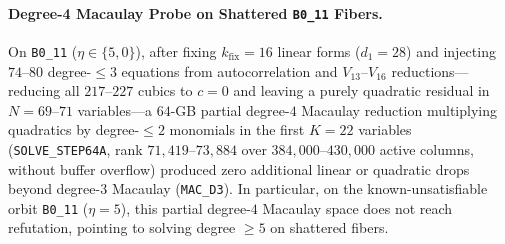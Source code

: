 \documentclass[11pt,a4paper]{article}
\theoremstyle{definition}
\begin{document}
\begin{table}[t]
\centering
\caption{Global ($k_{\mathrm{fix}}=0$) Boolean-ring matrix-pencil left-syzygy spectrum across \texttt{B0\_00}, \texttt{B0\_11}, and \texttt{B1\_11} (\texttt{SOLVE\_STEP68}--\texttt{SOLVE\_STEP70}).}
\label{tab:syzygies}
\end{table}

\paragraph{Degree-4 Macaulay Probe on Shattered \texttt{B0\_11} Fibers.}
On \texttt{B0\_11} ($\eta \in \{5,0\}$), after fixing $k_{\mathrm{fix}} = 16$ linear forms ($d_1 = 28$) and injecting $74$--$80$ degree-$\le 3$ equations from autocorrelation and $V_{13}$--$V_{16}$ reductions—reducing all $217$--$227$ cubics to $c=0$ and leaving a purely quadratic residual in $N=69$--$71$ variables—a $64$-GB partial degree-$4$ Macaulay reduction multiplying quadratics by degree-$\le 2$ monomials in the first $K=22$ variables (\texttt{SOLVE\_STEP64A}, rank $71{,}419$--$73{,}884$ over $384{,}000$--$430{,}000$ active columns, without buffer overflow) produced zero additional linear or quadratic drops beyond degree-$3$ Macaulay (\texttt{MAC\_D3}). In particular, on the known-unsatisfiable orbit \texttt{B0\_11} ($\eta=5$), this partial degree-$4$ Macaulay space does not reach refutation, pointing to solving degree $\ge 5$ on shattered fibers.
\end{document}
